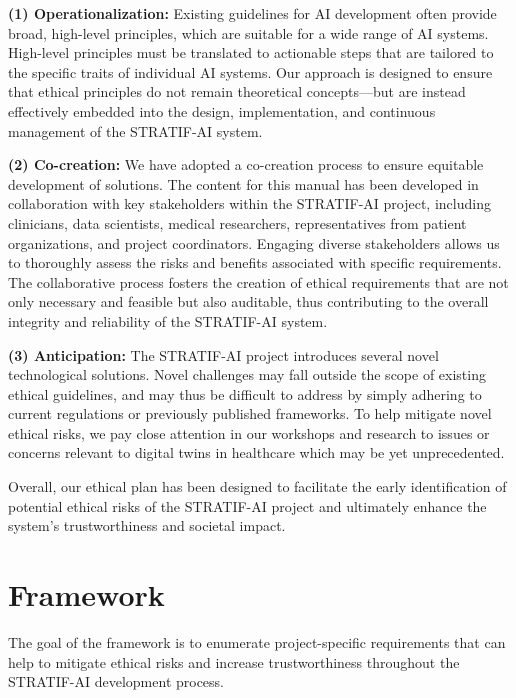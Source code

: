 \documentclass[
  letterpaper,
  DIV=11,
  numbers=noendperiod]{scrreport}
\begin{document}
\textbf{(1) Operationalization:} Existing guidelines for AI development
often provide broad, high-level principles, which are suitable for a
wide range of AI systems. High-level principles must be translated to
actionable steps that are tailored to the specific traits of individual
AI systems. Our approach is designed to ensure that ethical principles
do not remain theoretical concepts---but are instead effectively
embedded into the design, implementation, and continuous management of
the STRATIF-AI system.

\textbf{(2) Co-creation:} We have adopted a co-creation process to
ensure equitable development of solutions. The content for this manual
has been developed in collaboration with key stakeholders within the
STRATIF-AI project, including clinicians, data scientists, medical
researchers, representatives from patient organizations, and project
coordinators. Engaging diverse stakeholders allows us to thoroughly
assess the risks and benefits associated with specific requirements. The
collaborative process fosters the creation of ethical requirements that
are not only necessary and feasible but also auditable, thus
contributing to the overall integrity and reliability of the STRATIF-AI
system.

\textbf{(3) Anticipation:} The STRATIF-AI project introduces several
novel technological solutions. Novel challenges may fall outside the
scope of existing ethical guidelines, and may thus be difficult to
address by simply adhering to current regulations or previously
published frameworks. To help mitigate novel ethical risks, we pay close
attention in our workshops and research to issues or concerns relevant
to digital twins in healthcare which may be yet unprecedented.

Overall, our ethical plan has been designed to facilitate the early
identification of potential ethical risks of the STRATIF-AI project and
ultimately enhance the system's trustworthiness and societal impact.


\hypertarget{framework}{%
\chapter*{Framework}\label{framework}}


The goal of the framework is to enumerate project-specific requirements
that can help to mitigate ethical risks and increase trustworthiness
throughout the STRATIF-AI development process.
\end{document}
